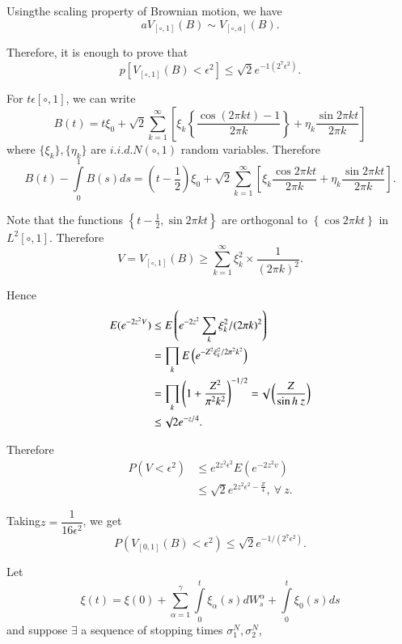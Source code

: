 \medskip
{} 
  Using\pageoriginale the scaling property of Brownian motion, we have
  $$
  aV_{[\circ, 1]}(B) \sim V_{[\circ, a]}(B).
  $$

Therefore, it is enough to prove that
$$
p\left[V_{[\circ, 1]}(B) < \epsilon ^2\right] \leq \sqrt{2}e^{-1(2^7
  \epsilon ^2)}. 
$$

For $t \epsilon  [\circ, 1]$, we can write
$$
B(t)=t \xi_0 +\surd{2} \sum_{k=1}^{\infty} \left[\xi_k \left\{\frac{\cos (2 \pi
    kt)-1}{2 \pi k}\right\}+\eta_k \frac{\sin 2 \pi kt}{2 \pi k}\right] 
$$
where $\{\xi _k\},\{\eta_k\}$ are $i. i. d. N(\circ, 1) $ random
variables. Therefore 
$$
B(t)-\int\limits_0^1 B(s)ds=\left(t-\frac{1}{2}\right)\xi_0 +\surd 2
\sum_{k=1}^{\infty}\left[\xi_k \frac{\cos 2 \pi kt}{2 \pi k}+\eta_k
  \frac{\sin 2 \pi kt}{2 \pi k}\right]. 
$$

Note that the functions $\left\{t-\frac{1}{2}, \sin 2 \pi kt \right\}$ are
orthogonal to $\left\{\cos 2\pi kt\right\}$ in $L^2[\circ, 1]$. Therefore 
$$
V=V_{[\circ, 1]}(B) \geq \sum_{k=1}^{\infty} \xi^2_k \times
\frac{1}{(2 \pi k)^2}. 
$$

Hence
\begin{align*}
  E(e^{-2z^2V}) & \leq E \left(e^{-2 z^2} \sum_k \xi_k^2/(2 \pi k)^2 \right)\\
  &=\prod_k E\left(e^{-Z^2 \xi_k^2/2 \pi^2 k^2}\right)\\
  & =\prod_k\left(1+ \frac{Z^2}{\pi^2 k^2}\right)^{-1/2}=\surd
  \left(\frac{Z}{\sin h ~z}\right)\\ 
  & \leq \surd{2} e^{-z/4}.
\end{align*}

Therefore
\begin{align*}
  P(V < \epsilon ^2) &\leq e^{2 z^2 \epsilon ^2} E(e^{-2z^2 v})\\
  & \leq \surd{2} e^{2 z^2 \epsilon^2- \frac{Z}{4}}, ~\forall~ z. 
\end{align*}

Taking\pageoriginale $z=\dfrac{1}{16 \epsilon ^2}$, we get
$$
P(V_{[0, 1]}(B)<\epsilon ^2) \leq \surd{2}e^{-1/(2^7 \epsilon ^2)}.
$$

\begin{example}\label{chap2:exam2.3}%
  Let
$$
  \xi(t)=\xi(0)+\sum_{\alpha=1}^{\gamma}\int\limits_0^t
  \xi_{\alpha}(s)dW_s^{\alpha}+\int\limits_0^t \xi_0(s)ds 
$$
and suppose $\exists$ a sequence of stopping times $\sigma_1^N,
\sigma_2^N$, 
\end{example}

